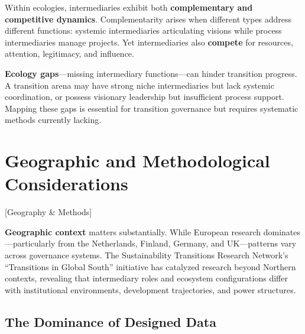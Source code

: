 \documentclass[../main.tex]{subfiles}
\begin{document}
Within ecologies, intermediaries exhibit both \textbf{complementary and competitive dynamics}. Complementarity arises when different types address different functions: systemic intermediaries articulating visions while process intermediaries manage projects. Yet intermediaries also \textbf{compete} for resources, attention, legitimacy, and influence.

\textbf{Ecology gaps}---missing intermediary functions---can hinder transition progress. A transition arena may have strong niche intermediaries but lack systemic coordination, or possess visionary leadership but insufficient process support. Mapping these gaps is essential for transition governance but requires systematic methods currently lacking.


\section{Geographic and Methodological Considerations}[Geography \& Methods]

\textbf{Geographic context} matters substantially. While European research dominates---particularly from the Netherlands, Finland, Germany, and UK---patterns vary across governance systems. The Sustainability Transitions Research Network's ``Transitions in Global South'' initiative has catalyzed research beyond Northern contexts, revealing that intermediary roles and ecosystem configurations differ with institutional environments, development trajectories, and power structures.

\subsection{The Dominance of Designed Data}
\end{document}
